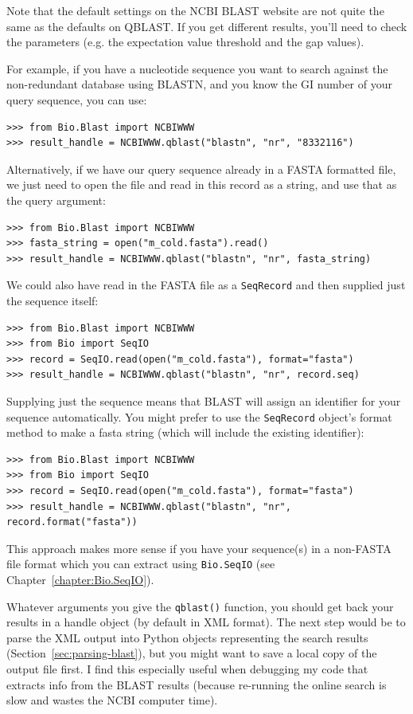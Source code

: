\documentclass{report}
\begin{document}
Note that the default settings on the NCBI BLAST website are not quite
the same as the defaults on QBLAST. If you get different results, you'll
need to check the parameters (e.g. the expectation value threshold and
the gap values).

For example, if you have a nucleotide sequence you want to search against
the non-redundant database using BLASTN, and you know the GI number of your
query sequence, you can use:

\begin{verbatim}
>>> from Bio.Blast import NCBIWWW
>>> result_handle = NCBIWWW.qblast("blastn", "nr", "8332116")
\end{verbatim}

Alternatively, if we have our query sequence already in a FASTA formatted
file, we just need to open the file and read in this record as a string,
and use that as the query argument:

\begin{verbatim}
>>> from Bio.Blast import NCBIWWW
>>> fasta_string = open("m_cold.fasta").read()
>>> result_handle = NCBIWWW.qblast("blastn", "nr", fasta_string)
\end{verbatim}

We could also have read in the FASTA file as a \verb|SeqRecord| and then
supplied just the sequence itself:

\begin{verbatim}
>>> from Bio.Blast import NCBIWWW
>>> from Bio import SeqIO
>>> record = SeqIO.read(open("m_cold.fasta"), format="fasta")
>>> result_handle = NCBIWWW.qblast("blastn", "nr", record.seq)
\end{verbatim}

Supplying just the sequence means that BLAST will assign an identifier
for your sequence automatically.  You might prefer to use the
\verb|SeqRecord| object's format method to make a fasta string
(which will include the existing identifier):

\begin{verbatim}
>>> from Bio.Blast import NCBIWWW
>>> from Bio import SeqIO
>>> record = SeqIO.read(open("m_cold.fasta"), format="fasta")
>>> result_handle = NCBIWWW.qblast("blastn", "nr", record.format("fasta"))
\end{verbatim}

This approach makes more sense if you have your sequence(s) in a
non-FASTA file format which you can extract using \verb|Bio.SeqIO|
(see Chapter~\ref{chapter:Bio.SeqIO}).

Whatever arguments you give the \verb|qblast()| function, you should
get back your results in a handle object (by default in XML format).
The next step would be to parse the XML output into Python objects
representing the search results (Section~\ref{sec:parsing-blast}),
but you might want to save a local copy of the output file first.
I find this especially useful when debugging my code that extracts
info from the BLAST results (because re-running the online search
is slow and wastes the NCBI computer time).
\end{document}
